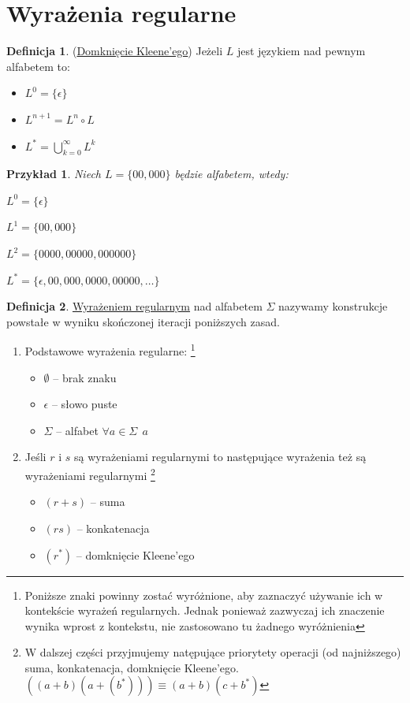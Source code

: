 \documentclass[12pt,a4paper]{article}
\newtheorem{przyklad}{Przykład}
\theoremstyle{definition}
\newtheorem{df}{Definicja}
\theoremstyle{remark}
\begin{document}
\section{Wyrażenia regularne}
	
	\begin{df}(\href{http://pl.wikipedia.org/wiki/Domkni%C4%99cie_Kleene'ego}{Domknięcie Kleene'ego}) Jeżeli $L$ jest językiem nad pewnym alfabetem to:
		\begin{itemize}
			\item $L^0 = \{\epsilon\}$
			\item $L^{n+1} = L^n \circ L$
			\item $L^* = \bigcup_{k=0}^\infty L^k$
		\end{itemize}
	\end{df}	
	
	\begin{przyklad}
		Niech $L = \{00, 000\}$ będzie alfabetem, wtedy:\\
		\begin{inparaenum} 
			\item $L^0 = \{\epsilon\}$
			\item $L^1 = \{00, 000\}$
			\item $L^2 = \{0000, 00000, 000000\}$
			\item $L^* = \{\epsilon, 00, 000, 0000, 00000, \dots\}$
		\end{inparaenum}
	\end{przyklad}
	
	\begin{df} \href{http://pl.wikipedia.org/wiki/Wyra%C5%BCenia_regularne}{Wyrażeniem regularnym} nad alfabetem $\Sigma$ nazywamy konstrukcje
	 powstałe w wyniku skończonej iteracji poniższych zasad.
		\begin{enumerate}
			\item Podstawowe wyrażenia regularne: \footnote{Poniższe znaki powinny zostać wyróżnione, aby zaznaczyć używanie ich w kontekście
			wyrażeń regularnych. Jednak ponieważ zazwyczaj ich znaczenie wynika wprost z kontekstu, nie zastosowano tu żadnego wyróżnienia}
				\begin{itemize}
					\item $\emptyset$ -- brak znaku
					\item $\epsilon$ -- słowo puste
					\item $\Sigma$ -- alfabet $\forall a\in\Sigma ~~ a$
				\end{itemize}
			\item Jeśli $r$ i $s$ są wyrażeniami regularnymi to następujące wyrażenia też są wyrażeniami regularnymi
				\footnote{W dalszej części przyjmujemy natępujące priorytety operacji (od najniższego) suma, konkatenacja, domknięcie Kleene'ego. 
				$((a+b)(a+(b^*))) \equiv (a+b)(c+b^*)$}
				\begin{itemize}
					\item $(r+s)$ -- suma
					\item $(rs)$ -- konkatenacja
					\item $(r^*)$ -- domknięcie Kleene'ego
				\end{itemize}
		\end{enumerate}		
	\end{df}	
	
\end{document}
